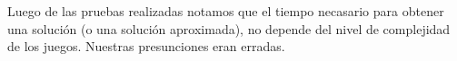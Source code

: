 \documentclass[a4paper,spanish]{article}
\begin{document}
Luego de las pruebas realizadas notamos que el tiempo necasario para obtener una solución (o una solución aproximada), no depende del nivel de complejidad de los juegos. Nuestras presunciones eran erradas. 
% 
% 
% 
% 
% 
% 
% 
\end{document}
